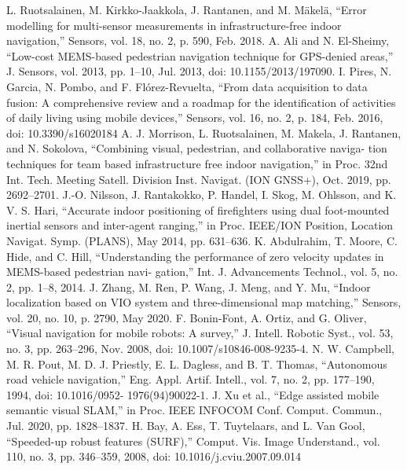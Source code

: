 \begin{thebibliography}{999}
	L. Ruotsalainen, M. Kirkko-Jaakkola, J. Rantanen, and M. Mäkelä,
“Error modelling for multi-sensor measurements in infrastructure-free
indoor navigation,” Sensors, vol. 18, no. 2, p. 590, Feb. 2018.
A. Ali and N. El-Sheimy, “Low-cost MEMS-based pedestrian navigation
technique for GPS-denied areas,” J. Sensors, vol. 2013, pp. 1–10,
Jul. 2013, doi: 10.1155/2013/197090.
	I. Pires, N. Garcia, N. Pombo, and F. Flórez-Revuelta, “From data
acquisition to data fusion: A comprehensive review and a roadmap
for the identification of activities of daily living using mobile devices,”
Sensors, vol. 16, no. 2, p. 184, Feb. 2016, doi: 10.3390/s16020184
A. J. Morrison, L. Ruotsalainen, M. Makela, J. Rantanen, and
N. Sokolova, “Combining visual, pedestrian, and collaborative naviga-
tion techniques for team based infrastructure free indoor navigation,”
in Proc. 32nd Int. Tech. Meeting Satell. Division Inst. Navigat. (ION
GNSS+), Oct. 2019, pp. 2692–2701.
J.-O. Nilsson, J. Rantakokko, P. Handel, I. Skog, M. Ohlsson,
and K. V. S. Hari, “Accurate indoor positioning of firefighters using
dual foot-mounted inertial sensors and inter-agent ranging,” in Proc.
IEEE/ION Position, Location Navigat. Symp. (PLANS), May 2014,
pp. 631–636.
K. Abdulrahim, T. Moore, C. Hide, and C. Hill, “Understanding the
performance of zero velocity updates in MEMS-based pedestrian navi-
gation,” Int. J. Advancements Technol., vol. 5, no. 2, pp. 1–8, 2014.
J. Zhang, M. Ren, P. Wang, J. Meng, and Y. Mu, “Indoor localization
based on VIO system and three-dimensional map matching,” Sensors,
vol. 20, no. 10, p. 2790, May 2020.
F. Bonin-Font, A. Ortiz, and G. Oliver, “Visual navigation for mobile
robots: A survey,” J. Intell. Robotic Syst., vol. 53, no. 3, pp. 263–296,
Nov. 2008, doi: 10.1007/s10846-008-9235-4.
N. W. Campbell, M. R. Pout, M. D. J. Priestly, E. L. Dagless,
and B. T. Thomas, “Autonomous road vehicle navigation,” Eng. Appl.
Artif. Intell., vol. 7, no. 2, pp. 177–190, 1994, doi: 10.1016/0952-
1976(94)90022-1.
J. Xu et al., “Edge assisted mobile semantic visual SLAM,” in Proc.
IEEE INFOCOM Conf. Comput. Commun., Jul. 2020, pp. 1828–1837.
 H. Bay, A. Ess, T. Tuytelaars, and L. Van Gool, “Speeded-up robust
features (SURF),” Comput. Vis. Image Understand., vol. 110, no. 3,
pp. 346–359, 2008, doi: 10.1016/j.cviu.2007.09.014
\end{thebibliography}




